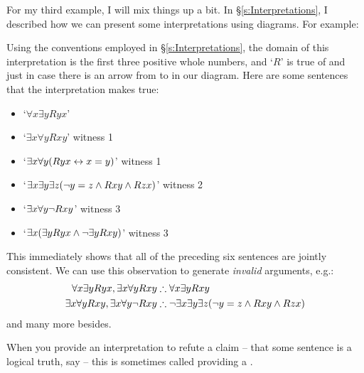 For my third example, I will mix things up a bit. In §\ref{s:Interpretations}, I described how we can present some interpretations using diagrams. For example:
\begin{center}
\end{center}
Using the conventions employed in §\ref{s:Interpretations}, the domain of this interpretation is the first three positive whole numbers, and `$R$' is true of  and  just in case there is an arrow from  to  in our diagram. Here are some sentences that the interpretation makes true:
	\begin{itemize}
		\item `$\forall x \exists y Ryx$' 
		\item `$\exists x \forall y Rxy$' \hfill witness 1
		\item `$\exists x \forall y (Ryx \leftrightarrow x = y)$' \hfill witness 1
		\item `$\exists x \exists y \exists z (\neg y = z \wedge Rxy \wedge Rzx)$' \hfill witness 2
		\item `$\exists x \forall y \neg Rxy$' \hfill witness 3
		\item `$\exists x (\exists y Ryx \wedge \neg \exists y Rxy)$' \hfill witness 3
	\end{itemize}
This immediately shows that all of the preceding six sentences are jointly consistent. We can use this observation to generate \emph{invalid} arguments, e.g.:
	\begin{align*}
		\forall x \exists y Ryx, \exists x \forall y Rxy  &\mathrel{\therefore}  \forall x \exists y Rxy\\
		\exists x \forall y Rxy, \exists x \forall y \neg Rxy & \mathrel{\therefore} \neg \exists x \exists y \exists z (\neg y = z \wedge Rxy \wedge Rzx)
	\end{align*}
and many more besides.

When you provide an interpretation to refute a claim – that some sentence is a logical truth, say – this is sometimes called providing a .

